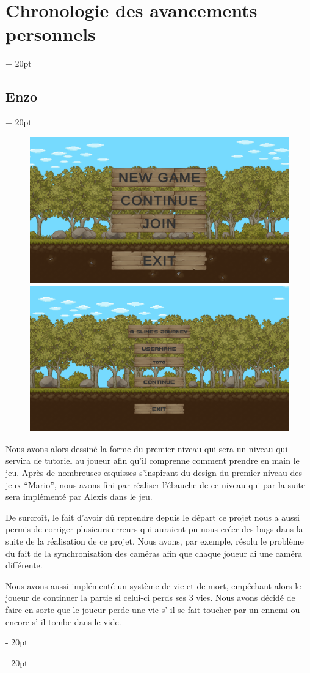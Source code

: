 \documentclass[a4paper, 12pt, twoside]{article}
\newcommand{\ind}[1][20pt]{\advance\leftskip + #1}
\newcommand{\deind}[1][20pt]{\advance\leftskip - #1}
\newenvironment{indt}[2][20pt]{#2 \par \ind[#1]}{\par \deind} %
\begin{document}
\begin{indt}{\section{Chronologie des avancements personnels}}
\begin{indt}{\subsection{Enzo}}
            \begin{figure}
                \includegraphics[width=0.49\linewidth]{MMV11.png}\hfill \hfill\includegraphics[width=0.49\linewidth]{MMV21.png}
            \end{figure}

            Nous avons alors dessiné la forme du premier niveau qui sera un niveau qui servira de tutoriel au joueur afin qu'il comprenne comment prendre en main le jeu. Après de nombreuses esquisses s'inspirant du design du premier niveau des jeux “Mario”, nous avons fini par réaliser l'ébauche de ce niveau qui par la suite sera implémenté par Alexis dans le jeu.

            De surcroît, le fait d'avoir dû reprendre depuis le départ ce projet nous a aussi permis de corriger plusieurs erreurs qui auraient pu nous créer des bugs dans la suite de la réalisation de ce projet. Nous avons, par exemple, résolu le problème du fait de la synchronisation des caméras afin que chaque joueur ai une caméra différente.
        	
            Nous avons aussi implémenté un système de vie et de mort, empêchant alors le joueur de continuer la partie si celui-ci perds ses 3 vies. Nous avons décidé de faire en sorte que le joueur perde une vie s' il se fait toucher par un ennemi ou encore s' il tombe dans le vide.


\end{indt}
\end{indt}
\end{document}
